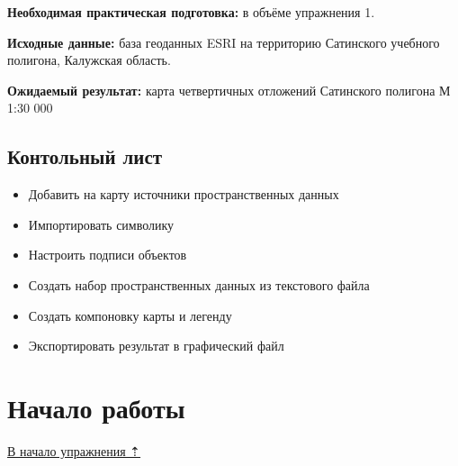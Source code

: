\documentclass[
  12pt,
]{book}
\providecommand{\tightlist}{%
  \setlength{\itemsep}{0pt}\setlength{\parskip}{0pt}}
\begin{document}
\textbf{Необходимая практическая подготовка:} в объёме упражнения 1.

\textbf{Исходные данные:} база геоданных ESRI на территорию Сатинского учебного полигона, Калужская область.

\textbf{Ожидаемый результат:} карта четвертичных отложений Сатинского полигона М 1:30 000

\hypertarget{map-design-quaternary-checklist}{%
\subsection{Контольный лист}\label{map-design-quaternary-checklist}}

\begin{itemize}
\tightlist
\item
  Добавить на карту источники пространственных данных
\item
  Импортировать символику
\item
  Настроить подписи объектов
\item
  Создать набор пространственных данных из текстового файла
\item
  Создать компоновку карты и легенду
\item
  Экспортировать результат в графический файл
\end{itemize}

\hypertarget{map-design-quaternary-begin}{%
\section{Начало работы}\label{map-design-quaternary-begin}}

\protect\hyperlink{map-design-quaternary}{В начало упражнения ⇡}
\end{document}
